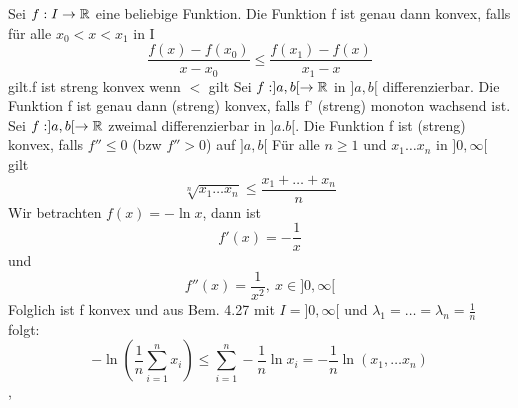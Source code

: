 \Lemma[4.28] Sei \(f : I \rightarrow \mathbb{R} \) eine beliebige Funktion. Die Funktion f ist genau dann konvex, falls für alle \(x_0 < x < x_1 \) in I
\[ \frac{f(x) - f(x_0)}{x - x_0} \leq \frac{f(x_1) - f(x)}{x_1 - x}\]
gilt.\newline f ist streng konvex wenn \( < \) gilt \newline
\Satz[4.29] Sei \(f : ]a,b[ \rightarrow \mathbb{R} \) in \(]a,b[\) differenzierbar. Die Funktion f ist genau dann (streng) konvex, falls f' (streng) monoton wachsend ist. \newline \newline \newline
\Korollar[4.30] Sei \(f : ]a,b[ \rightarrow \mathbb{R} \) zweimal differenzierbar in \(]a.b[\). Die Funktion f ist (streng) konvex, falls \(f'' \leq 0\) (bzw \(f'' > 0\)) auf \(]a,b[\) \newline
\Bsp[4.31] Für alle \( n \geq 1 \) und \( x_1 \dots x_n\) in \( ]0, \infty [\) gilt
\[ \sqrt[n]{x_1 \dots x_n} \leq \frac{x_1 + \dots + x_n}{n}\]
Wir betrachten \( f(x) = - \ln x\), dann ist
\[ f'(x) = -\frac{1}{x}\]
und
\[ f''(x) = \frac{1}{x^2}, \ x \in ]0,\infty [\]
Folglich ist f konvex und aus Bem. 4.27 mit \newline \( I = ]0,\infty [\) und \( \lambda_1 = \dots = \lambda_n = \frac{1}{n}\) folgt:
\[ -\ln \left( \frac{1}{n} \sum_{i = 1}^{n} x_i\right) \leq \sum_{i=1}^{n} -\frac{1}{n} \ln x_i = -\frac{1}{n} \ln (x_1, \dots x_n)\]
\sep
